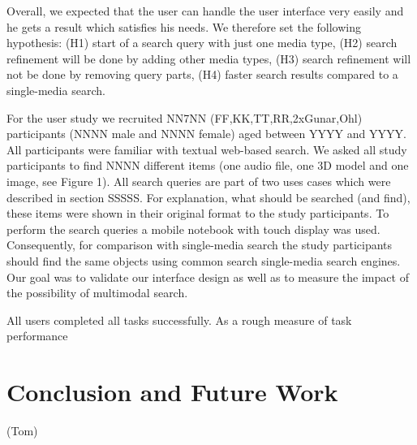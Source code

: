 \documentclass[runningheads,a4paper]{llncs}
\begin{document}
Overall, we expected that the user can handle the user interface very easily and he gets a 
result which satisfies his needs. We therefore set the following hypothesis: (H1) start of 
a search query with just one media type, (H2) search refinement will be done by adding other 
media types, (H3) search refinement will not be done by removing query parts, (H4) faster 
search results compared to a single-media search.

For the user study we recruited NN7NN (FF,KK,TT,RR,2xGunar,Ohl) participants (NNNN male and NNNN female) 
aged between YYYY and YYYY. All participants were familiar with textual web-based search. 
We asked all study participants to find NNNN different items (one audio file, one 3D model and 
one image, see Figure 1). All search queries are part of two uses cases which were described in 
section SSSSS. For explanation, what should be searched (and find), these items were shown in their 
original format to the study participants. To perform the search queries a mobile notebook with 
touch display was used. Consequently, for comparison with single-media search the study participants 
should find the same objects using common search single-media search engines.
Our goal was to validate our interface design as well as to measure the impact of the possibility of 
multimodal search. 

All users completed all tasks successfully. As a rough measure of task performance

\section{Conclusion and Future Work}
(Tom)



\end{document}
